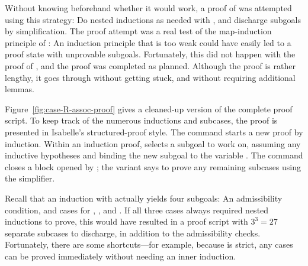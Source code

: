 Without knowing beforehand whether it would work, a proof of  was attempted using this strategy: Do nested inductions as needed with , and discharge subgoals by simplification. The proof attempt was a real test of the map-induction principle of : An induction principle that is too weak could have easily led to a proof state with unprovable subgoals. Fortunately, this did not happen with the proof of , and the proof was completed as planned. Although the proof is rather lengthy, it goes through without getting stuck, and without requiring additional lemmas.

Figure~\ref{fig:case-R-assoc-proof} gives a cleaned-up version of the complete proof script. To keep track of the numerous inductions and subcases, the proof is presented in Isabelle's structured-proof style. The command  starts a new proof by induction. Within an induction proof,  selects a subgoal to work on, assuming any inductive hypotheses and binding the new subgoal to the variable . The  command closes a block opened by ; the variant  says to prove any remaining subcases using the simplifier.

Recall that an induction with  actually yields four subgoals: An admissibility condition, and cases for , , and . If all three cases always required nested inductions to prove, this would have resulted in a proof script with $3^3 = 27$ separate subcases to discharge, in addition to the admissibility checks. Fortunately, there are some shortcuts---for example, because  is strict, any  cases can be proved immediately without needing an inner induction.

